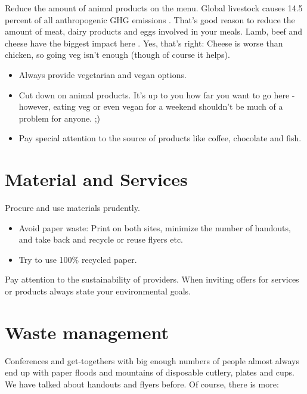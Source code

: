 \begin{suggest}{Reduce the amount of animal products on the menu.}
	Global livestock causes 14.5 percent of all anthropogenic GHG emissions \cite{livestock}. That's good reason to reduce the amount of meat, dairy products and eggs involved in your meals. Lamb, beef and cheese have the biggest impact here \cite{animalGHG}. Yes, that's right: Cheese is worse than chicken, so going veg isn't enough (though of course it helps).
	\begin{itemize}
		\item Always provide vegetarian and vegan options.
		\item Cut down on animal products. It's up to you how far you want to go here - however, eating veg or even vegan for a weekend shouldn't be much of a problem for anyone. ;)
		\item Pay special attention to the source of products like coffee, chocolate and fish.
	\end{itemize}
\end{suggest}

\section{Material and Services}
\begin{suggest}{Procure and use materials prudently.}
	\vspace{-2\topsep}
	\begin{itemize}
	\item Avoid paper waste: Print on both sites, minimize the number of handouts, and take back and recycle or reuse flyers etc.
	\item Try to use 100\% recycled paper.
	\end{itemize}
\end{suggest}

\begin{suggest}{Pay attention to the sustainability of providers.}
	When inviting offers for services or products always state your environmental goals.
\end{suggest}

\section{Waste management} 
Conferences and get-togethers with big enough numbers of people almost always end up with paper floods and mountains of disposable cutlery, plates and cups. We have talked about handouts and flyers before. Of course, there is more:

